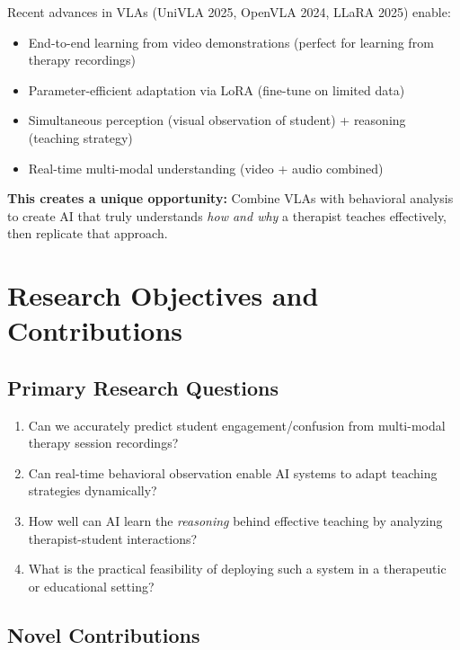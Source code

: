 \documentclass[12pt, a4paper]{article}
\begin{document}
Recent advances in VLAs (UniVLA 2025, OpenVLA 2024, LLaRA 2025) enable:
\begin{itemize}
    \item End-to-end learning from video demonstrations (perfect for learning from therapy recordings)
    \item Parameter-efficient adaptation via LoRA (fine-tune on limited data)
    \item Simultaneous perception (visual observation of student) + reasoning (teaching strategy)
    \item Real-time multi-modal understanding (video + audio combined)
\end{itemize}

\textbf{This creates a unique opportunity:} Combine VLAs with behavioral analysis to create AI that truly understands \textit{how and why} a therapist teaches effectively, then replicate that approach.

\section{Research Objectives and Contributions}

\subsection{Primary Research Questions}

\begin{enumerate}
    \item Can we accurately predict student engagement/confusion from multi-modal therapy session recordings?
    \item Can real-time behavioral observation enable AI systems to adapt teaching strategies dynamically?
    \item How well can AI learn the \textit{reasoning} behind effective teaching by analyzing therapist-student interactions?
    \item What is the practical feasibility of deploying such a system in a therapeutic or educational setting?
\end{enumerate}

\subsection{Novel Contributions}
\end{document}
